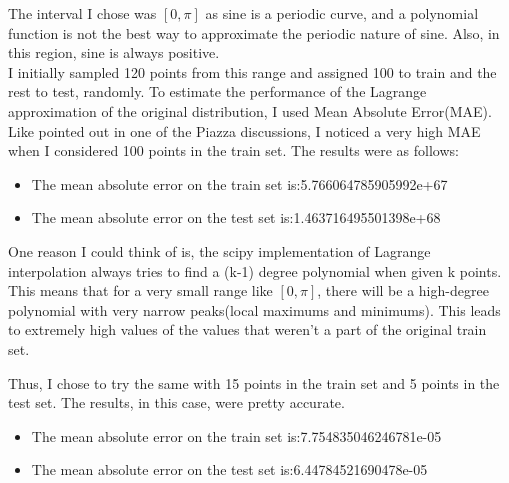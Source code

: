 \documentclass[a4paper]{article}
\theoremstyle{definition}
\newenvironment{soln}{
    \leavevmode\color{blue}\ignorespaces
}{}
\begin{document}
\begin{soln}
    The interval I chose was $[0,\pi]$ as sine is a periodic curve, and a polynomial function is not the best way to approximate the periodic nature of sine. Also, in this region, sine is always positive. \\

    I initially sampled 120 points from this range and assigned 100 to train and the rest to test, randomly. To estimate the performance of the Lagrange approximation of the original distribution, I used Mean Absolute Error(MAE). Like pointed out in one of the Piazza discussions, I noticed a very high MAE when I considered 100 points in the train set. The results were as follows: \\
    \begin{itemize}
        \item The mean absolute error on the train set is:5.766064785905992e+67
        \item The mean absolute error on the test set is:1.463716495501398e+68
    \end{itemize}
    
    One reason I could think of is, the scipy implementation of Lagrange interpolation always tries to find a (k-1) degree polynomial when given k points. This means that for a very small range like $[0,\pi]$, there will be a high-degree polynomial with very narrow peaks(local maximums and minimums). This leads to extremely high values of the values that weren't a part of the original train set.

    Thus, I chose to try the same with 15 points in the train set and 5 points in the test set. The results, in this case, were pretty accurate.
    \begin{itemize}
        \item The mean absolute error on the train set is:7.754835046246781e-05
        \item The mean absolute error on the test set is:6.44784521690478e-05
    \end{itemize}


\end{soln}
\end{document}
